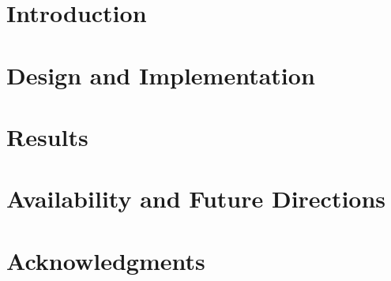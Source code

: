 \documentclass[aps,pre,twocolumn,nofootinbib,superscriptaddress,linenumbers]{revtex4-1}
\begin{document}
\section{Introduction}
\label{section:introduction}

\section{Design and Implementation}
\label{section:design}

\section{Results}
\label{section:results}

\section{Availability and Future Directions}
\label{section:availability}

\section{Acknowledgments}
\label{section:acknowledgments}


% 

\end{document}
